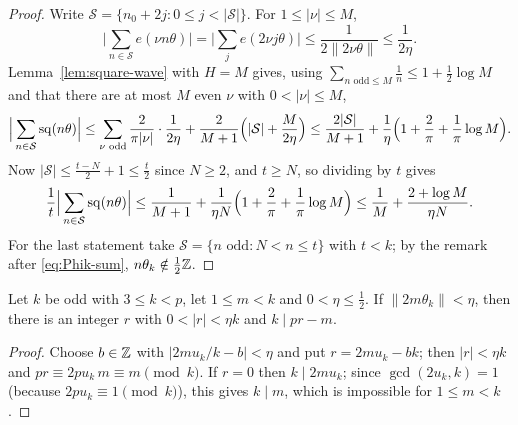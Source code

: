 \begin{proof}
Write $\mathcal{S}=\{n_0+2j:0\le j<|\mathcal{S}|\}$. For $1\le|\nu|\le M$,
\[
\Big|\sum_{n\in\mathcal{S}}e(\nu n\theta)\Big|=\Big|\sum_je(2\nu j\theta)\Big|\le\frac1{2\|2\nu\theta\|}\le\frac1{2\eta}.
\]
Lemma~\ref{lem:square-wave} with $H=M$ gives, using $\sum_{n\text{ odd}\le M}\frac1n\le1+\frac12\log M$ and that there are at most $M$ even $\nu$ with $0<|\nu|\le M$,
\[
\Big|\sum_{n\in\mathcal{S}}\operatorname{sq}(n\theta)\Big|\le\sum_{\nu\text{ odd}}\frac2{\pi|\nu|}\cdot\frac1{2\eta}+\frac2{M+1}
\Bigl(|\mathcal{S}|+\frac M{2\eta}\Bigr)\le\frac{2|\mathcal{S}|}{M+1}+\frac1\eta\Bigl(1+\frac2\pi+\frac1\pi\log M\Bigr).
\]
Now $|\mathcal{S}|\le\frac{t-N}2+1\le\frac t2$ since $N\ge2$, and $t\ge N$, so dividing by $t$ gives
\[
\frac1t\Big|\sum_{n\in\mathcal{S}}\operatorname{sq}(n\theta)\Big|\le\frac1{M+1}+\frac{1}{\eta N}\Bigl(1+\frac2\pi+\frac1\pi\log M\Bigr)\le\frac1M+\frac{2+\log M}{\eta N}.
\]
For the last statement take
$\mathcal{S}=\{n\text{ odd}:N<n\le t\}$ with $t<k$; by the remark after \eqref{eq:Phik-sum},
$n\theta_k\notin\frac12\mathbb{Z}$.
\end{proof}

\begin{lemma}[Witnesses]\label{lem:witnesses}
Let $k$ be odd with $3\le k<p$, let $1\le m<k$ and $0<\eta\le\frac12$. If $\|2m\theta_k\|<\eta$, then there is an
integer $r$ with $0<|r|<\eta k$ and $k\mid pr-m$.
\end{lemma}

\begin{proof}
Choose $b\in\mathbb{Z}$ with $|2mu_k/k-b|<\eta$ and put $r=2mu_k-bk$; then $|r|<\eta k$ and $pr\equiv2pu_k\,m\equiv m\pmod
k$. If $r=0$ then $k\mid2mu_k$; since $\gcd(2u_k,k)=1$ (because $2pu_k\equiv1\pmod k$), this gives $k\mid m$, which is impossible for $1\le m<k$.
\end{proof}
